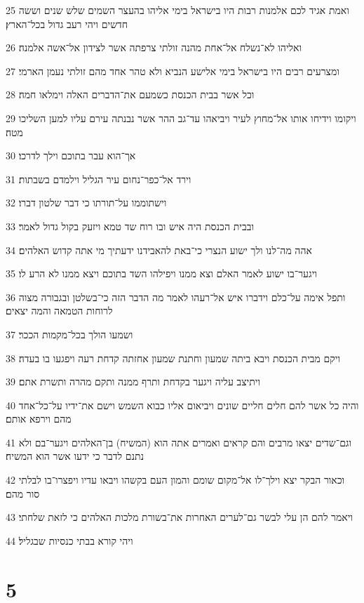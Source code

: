 \par 25 ואמת אגיד לכם אלמנות רבות היו בישראל בימי אליהו בהעצר השמים שלש שנים וששה חדשים ויהי רעב גדול בכל־הארץ׃
\par 26 ואליהו לא־נשלח אל־אחת מהנה זולתי צרפתה אשר לצידון אל־אשה אלמנה׃
\par 27 ומצרעים רבים היו בישראל בימי אלישע הנביא ולא טהר אחד מהם זולתי נעמן הארמי׃
\par 28 וכל אשר בבית הכנסת כשמעם את־הדברים האלה וימלאו חמה׃
\par 29 ויקומו וידיחו אותו אל־מחוץ לעיר ויביאהו עד־גב ההר אשר נבנתה עירם עליו למען השליכו מטה׃
\par 30 אך־הוא עבר בתוכם וילך לדרכו׃
\par 31 וירד אל־כפר־נחום עיר הגליל וילמדם בשבתות׃
\par 32 וישתוממו על־תורתו כי דבר שלטון דברו׃
\par 33 ובבית הכנסת היה איש ובו רוח שד טמא ויזעק בקול גדול לאמר׃
\par 34 אהה מה־לנו ולך ישוע הנצרי כי־באת להאבידנו ידעתיך מי אתה קדוש האלהים׃
\par 35 ויגער־בו ישוע לאמר האלם וצא ממנו ויפילהו השד בתוכם ויצא ממנו לא הרע לו׃
\par 36 ותפל אימה על־כלם וידברו איש אל־רעהו לאמר מה הדבר הזה כי־בשלטן ובגבורה מצוה לרוחות הטמאה והמה יצאים׃
\par 37 ושמעו הולך בכל־מקמות הככר׃
\par 38 ויקם מבית הכנסת ויבא ביתה שמעון וחתנת שמעון אחזתה קדחת רעה ויפגעו בו בעדה׃
\par 39 ויתיצב עליה ויגער בקדחת ותרף ממנה ותקם מהרה ותשרת אתם׃
\par 40 והיה כל אשר להם חלים חליים שונים ויביאום אליו כבוא השמש וישם את־ידיו על־כל־אחד מהם וירפא אותם׃
\par 41 וגם־שדים יצאו מרבים והם קראים ואמרים אתה הוא (המשיח) בן־האלהים ויגער־בם ולא נתנם לדבר כי ידעו אשר הוא המשיח׃
\par 42 וכאור הבקר יצא וילך־לו אל־מקום שומם והמון העם בקשהו ויבאו עדיו ויפצרו־בו לבלתי סור מהם׃
\par 43 ויאמר להם הן עלי לבשר גם־לערים האחרות את־בשורת מלכות האלהים כי לזאת שלחתי׃
\par 44 ויהי קורא בבתי כנסיות שבגליל׃

\chapter{5}

